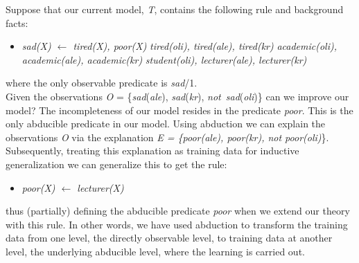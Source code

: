 \begin{example}
Suppose that our current model, \textit{T}, contains the following rule and background facts:
\begin{itemize}
\item[] \textit{sad(X) \quad  $\leftarrow$ \quad  tired(X), poor(X)}
\textit{tired(oli), tired(ale), tired(kr)} 
\textit{academic(oli), academic(ale), academic(kr)} 
\textit{student(oli), lecturer(ale), lecturer(kr)}
\end{itemize}
\noindent where the only observable predicate is \textit{sad}/1.\\
Given the observations \textit{O} = \{\textit{sad}(\textit{ale}), \textit{sad}(\textit{kr}), \textit{not}~\textit{sad}(\textit{oli})\} can we improve our model? The incompleteness of our model resides in the predicate \textit{poor}. This is the only abducible predicate in our model. Using abduction we can explain the observations \textit{O} via the explanation \textit{E = \{poor(ale), poor(kr), not poor(oli)}\}.
\noindent Subsequently, treating this explanation as training data for inductive generalization we can generalize this to get the rule:
\begin{itemize}
\item[] \textit{poor(X) \quad  $\leftarrow$ \quad  lecturer(X)}
\end{itemize}
\noindent thus (partially) defining the abducible predicate \textit{poor} when we extend our theory with this rule. In other words, we have used abduction to transform the training data from one level, the directly observable level, to training data at another level, the underlying abducible level, where the learning is carried out.
\end{example}


